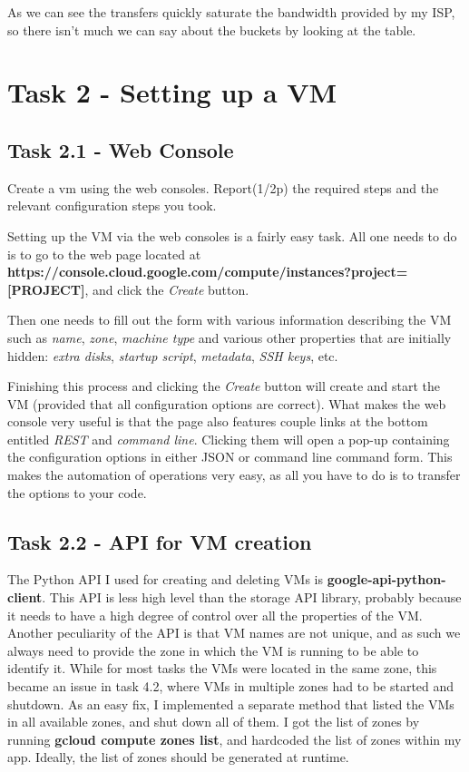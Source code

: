 \documentclass[paper=a4, fontsize=11pt]{scrartcl}
\numberwithin{equation}{section}    %
\numberwithin{figure}{section}      %
\numberwithin{table}{section}       %
\begin{document}
As we can see the transfers quickly saturate the bandwidth provided by my ISP, so there isn't much we can say about the buckets by looking at the table.

\section{Task 2 - Setting up a VM}

\subsection{Task 2.1 - Web Console}

Create a vm using the web consoles. Report(1/2p) the required steps and
the relevant configuration steps you took.

Setting up the VM via the web consoles is a fairly easy task.
All one needs to do is to go to the web page located at \textbf{https://console.cloud.google.com/compute/instances?project=[PROJECT]},
and click the \textit{Create} button.

Then one needs to fill out the form with various information describing the VM such as \textit{name}, \textit{zone}, \textit{machine type} and various other properties that are initially hidden:  \textit{extra disks}, \textit{startup script}, \textit{metadata}, \textit{SSH keys}, etc.

Finishing this process and clicking the \textit{Create} button will create and start the VM (provided that all configuration options are correct).
What makes the web console very useful is that the page also features couple links at the bottom entitled \textit{REST} and \textit{command line}. Clicking them will open a pop-up containing the configuration options in either JSON or command line command form.
This makes the automation of operations very easy, as all you have to do is to transfer the options to your code.

\subsection{Task 2.2 - API for VM creation}

The Python API I used for creating and deleting VMs is \textbf{google-api-python-client}.
This API is less high level than the storage API library, probably because it needs to have a high degree of control over all the properties of the VM.
Another peculiarity of the API is that VM names are not unique, and as such we always need to provide the zone in which the VM is running to be able to identify it.
While for most tasks the VMs were located in the same zone, this became an issue in task 4.2, where VMs in multiple zones had to be started and shutdown. As an easy fix, I implemented a separate method that listed the VMs in all available zones, and shut down all of them.
I got the list of zones by running \textbf{gcloud compute zones list}, and hardcoded the list of zones within my app. Ideally, the list of zones should be generated at runtime.
\end{document}
